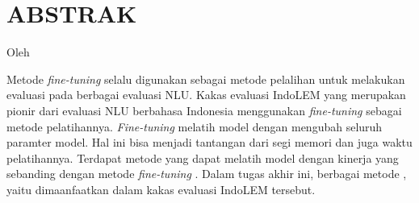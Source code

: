 \clearpage
\chapter*{ABSTRAK}

\begin{center}
    \center
    \begin{singlespace}
        \large\bfseries\MakeUppercase{\thetitle}
    
        \normalfont\normalsize
        Oleh
    
        \bfseries \theauthor
    \end{singlespace}
\end{center} 

\begin{singlespace}
    Metode \textit{fine-tuning}  selalu digunakan sebagai metode pelalihan untuk melakukan evaluasi pada berbagai evaluasi NLU. Kakas evaluasi IndoLEM yang merupakan pionir dari evaluasi NLU berbahasa Indonesia menggunakan \textit{fine-tuning} sebagai metode pelatihannya. \textit{Fine-tuning} melatih model dengan mengubah seluruh paramter model. Hal ini bisa menjadi tantangan dari segi memori dan juga waktu pelatihannya. Terdapat metode \PEFT yang dapat melatih model dengan kinerja yang sebanding dengan metode \textit{fine-tuning} . Dalam tugas akhir ini, berbagai metode \PEFT, yaitu \methodPEFT dimaanfaatkan dalam kakas evaluasi IndoLEM tersebut.
\end{singlespace}

\clearpage
